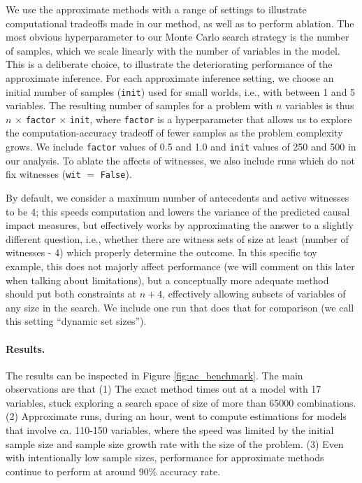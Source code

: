 \documentclass[anon,12pt]{clear2026} %
\renewcommand{\texttt}[1]{\lstinline[basicstyle=\fontsize{8pt}{8.25pt}\selectfont\ttfamily]{#1}}
\begin{document}
We use the approximate methods with a range of settings to illustrate computational tradeoffs made in our method, as well as to perform ablation. The most obvious hyperparameter to our Monte Carlo search strategy is the number of samples, which we scale linearly with the number of variables in the model. This is a deliberate choice, to illustrate the deteriorating performance of the approximate inference. For each approximate inference setting, we choose an initial number of samples (\texttt{init}) used for small worlds, i.e., with between 1 and 5 variables. The resulting number of samples for a problem with $n$ variables is thus $n$ $\times$ \texttt{factor} $\times$ \texttt{init}, where \texttt{factor} is a hyperparameter that allows us to explore the computation-accuracy tradeoff of fewer samples as the problem complexity grows. We include \texttt{factor} values of \num{0.5} and \num{1.0} and \texttt{init} values of \num{250} and \num{500} in our analysis. To ablate the affects of witnesses, we also include runs which do not fix witnesses (\texttt{wit} $=$ \texttt{False}).

By default, we consider a maximum number of antecedents and active witnesses to be \num{4}; this speeds computation and lowers the variance of the predicted causal impact measures, but effectively works by approximating the answer to a slightly different question, i.e., whether there are witness sets of size at least (number of witnesses - 4) which properly determine the outcome. In this specific toy example, this does not majorly affect performance (we will comment on this later when talking about limitations), but a conceptually more adequate method should put both constraints at $n+4$, effectively allowing subsets of variables of any size in the search. We include one run that does that for comparison (we call this setting ``dynamic set sizes'').

\paragraph{Results.}
The results can be inspected in Figure \ref{fig:ac_benchmark}.  The main observations are that (1) The exact method times out at a model with 17 variables, stuck exploring a search space of size of more than \num{65000} combinations. (2) Approximate runs, during an hour, went to compute estimations for models that involve ca. 110-150 variables, where the speed was limited by the initial sample size and sample size growth rate with the size of the problem. (3) Even with intentionally low sample sizes, performance for approximate methods continue to perform at around 90\% accuracy rate. 
\end{document}
